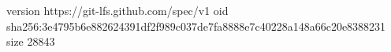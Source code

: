 version https://git-lfs.github.com/spec/v1
oid sha256:3e4795b6e882624391df2f989c037de7fa8888e7c40228a148a66c20e8388231
size 28843
